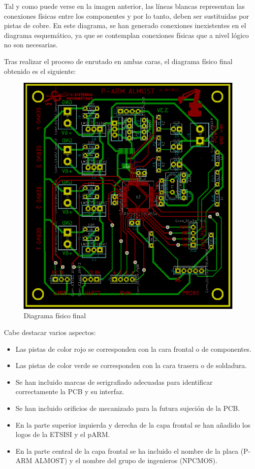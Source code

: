 Tal y como puede verse en la imagen anterior, las líneas blancas representan las conexiones físicas entre los componentes y por lo tanto, deben ser sustituidas por pistas de cobre. En este diagrama, se han generado conexiones inexistentes en el diagrama esquemático, ya que se contemplan conexiones físicas que a nivel lógico no son necesarias.

Tras realizar el proceso de enrutado en ambas caras, el diagrama físico final obtenido es el siguiente:

\begin{figure}[H]
\centering 
\includegraphics[width=0.9\linewidth]{pictures/PCB_FINAL_FIXED.PNG}
\caption{Diagrama físico final}
\label{fig:kdiagram}
\end{figure}

Cabe destacar varios aspectos:
\begin{itemize}
    \item Las pistas de color rojo se corresponden con la cara frontal o de componentes.
    \item Las pistas de color verde se corresponden con la cara trasera o de soldadura.
    \item Se han incluido marcas de serigrafiado adecuadas para identificar correctamente la PCB y su interfaz.
    \item Se han incluido orificios de mecanizado para la futura sujeción
    de la PCB.
    \item En la parte superior izquierda y derecha de la capa frontal se han añadido los logos de la ETSISI y el pARM.
    \item En la parte central de la capa frontal se ha incluido el nombre de la placa (P-ARM ALMOST) y el nombre del grupo de ingenieros (NPCMOS).
\end{itemize}

